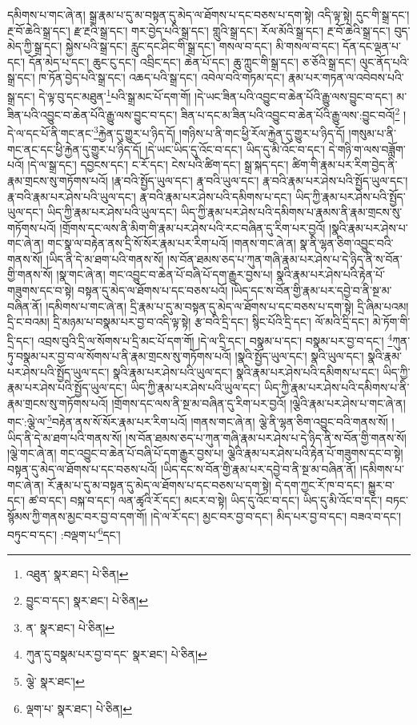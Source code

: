 དམིགས་པ་གང་ཞེ་ན། སྒྲ་རྣམ་པ་དུ་མ་བསྟན་དུ་མེད་ལ་ཐོགས་པ་དང་བཅས་པ་དག་སྟེ། འདི་ལྟ་སྟེ། དུང་གི་སྒྲ་དང་། རྔ་བོ་ཆེའི་སྒྲ་དང་། རྫ་རྔའི་སྒྲ་དང་། གར་བྱེད་པའི་སྒྲ་དང་། གླུའི་སྒྲ་དང་། རོལ་མོའི་སྒྲ་དང་། རྔ་བོ་ཆེའི་སྒྲ་དང་། བུད་མེད་ཀྱི་སྒྲ་དང་། སྐྱེས་པའི་སྒྲ་དང་། རླུང་དང་ཤིང་གི་སྒྲ་དང་། གསལ་བ་དང་། མི་གསལ་བ་དང་། དོན་དང་ལྡན་པ་དང་། དོན་མེད་པ་དང་། ཆུང་ངུ་དང་། འབྲིང་དང་། ཆེན་པོ་དང་། ཆུ་ཀླུང་གི་སྒྲ་དང་། ཅ་ཅོའི་སྒྲ་དང་། ལུང་ནོད་པའི་སྒྲ་དང་། ཁ་ཏོན་བྱེད་པའི་སྒྲ་དང་། འཆད་པའི་སྒྲ་དང་། འབེལ་བའི་གཏམ་དང་། རྣམ་པར་གཏན་ལ་འབེབས་པའི་སྒྲ་དང་། དེ་ལྟ་བུ་དང་མཐུན་\footnote{འཐུན་  སྣར་ཐང་།  པེ་ཅིན། }པའི་སྒྲ་མང་པོ་དག་གོ། །དེ་ཡང་ཟིན་པའི་འབྱུང་བ་ཆེན་པོའི་རྒྱུ་ལས་བྱུང་བ་དང་། མ་ཟིན་པའི་འབྱུང་བ་ཆེན་པོའི་རྒྱུ་ལས་བྱུང་བ་དང་། ཟིན་པ་དང་མ་ཟིན་པའི་འབྱུང་བ་ཆེན་པོའི་རྒྱུ་ལས་:བྱུང་བའོ།\footnote{བྱུང་བ་དང་།  སྣར་ཐང་།  པེ་ཅིན། } །དེ་ལ་དང་པོ་ནི་གང་ནང་\footnote{ན་  སྣར་ཐང་།  པེ་ཅིན། }རྐྱེན་དུ་གྱུར་པ་ཉིད་དོ། །གཉིས་པ་ནི་གང་ཕྱི་རོལ་རྐྱེན་དུ་གྱུར་པ་ཉིད་དོ། །གསུམ་པ་ནི་གང་ནང་དང་ཕྱི་རྐྱེན་དུ་གྱུར་པ་ཉིད་དོ། །དེ་ཡང་ཡིད་དུ་འོང་བ་དང་། ཡིད་དུ་མི་འོང་བ་དང་། དེ་གཉི་ག་ལས་བཟློག་པའོ། །དེ་ལ་སྒྲ་དང་། དབྱངས་དང་། ང་རོ་དང་། ངེས་པའི་ཚིག་དང་། སྒྲ་སྐད་དང་། ཚིག་གི་རྣམ་པར་རིག་བྱེད་ནི་རྣམ་གྲངས་སུ་གཏོགས་པའོ། །རྣ་བའི་སྤྱོད་ཡུལ་དང་། རྣ་བའི་ཡུལ་དང་། རྣ་བའི་རྣམ་པར་ཤེས་པའི་སྤྱོད་ཡུལ་དང་། རྣ་བའི་རྣམ་པར་ཤེས་པའི་ཡུལ་དང་། རྣ་བའི་རྣམ་པར་ཤེས་པའི་དམིགས་པ་དང་། ཡིད་ཀྱི་རྣམ་པར་ཤེས་པའི་སྤྱོད་ཡུལ་དང་། ཡིད་ཀྱི་རྣམ་པར་ཤེས་པའི་ཡུལ་དང་། ཡིད་ཀྱི་རྣམ་པར་ཤེས་པའི་དམིགས་པ་རྣམས་ནི་རྣམ་གྲངས་སུ་གཏོགས་པའོ། །གྲོགས་དང་ལས་ནི་མིག་གི་རྣམ་པར་ཤེས་པའི་རང་བཞིན་དུ་རིག་པར་བྱའོ། །སྣའི་རྣམ་པར་ཤེས་པ་གང་ཞེ་ན། གང་སྣ་ལ་བརྟེན་ནས་དྲི་སོ་སོར་རྣམ་པར་རིག་པའོ། །གནས་གང་ཞེ་ན། སྣ་ནི་ལྷན་ཅིག་འབྱུང་བའི་གནས་སོ། །ཡིད་ནི་དེ་མ་ཐག་པའི་གནས་སོ། །ས་བོན་ཐམས་ཅད་པ་ཀུན་གཞི་རྣམ་པར་ཤེས་པ་དེ་ཉིད་ནི་ས་བོན་གྱི་གནས་སོ། །སྣ་གང་ཞེ་ན། གང་འབྱུང་བ་ཆེན་པོ་བཞི་པོ་དག་རྒྱུར་བྱས་པ། སྣའི་རྣམ་པར་ཤེས་པའི་རྟེན་པོ་གཟུགས་དང་བ་སྟེ། བསྟན་དུ་མེད་ལ་ཐོགས་པ་དང་བཅས་པའོ། །ཡིད་དང་ས་བོན་གྱི་རྣམ་པར་དབྱེ་བ་ནི་སྔ་མ་བཞིན་ནོ། །དམིགས་པ་གང་ཞེ་ན། དྲི་རྣམ་པ་དུ་མ་བསྟན་དུ་མེད་ལ་ཐོགས་པ་དང་བཅས་པ་དག་སྟེ། དྲི་ཞིམ་པའམ། དྲི་ང་བའམ། དྲི་མཉམ་པ་བསྣམ་པར་བྱ་བ་འདི་ལྟ་སྟེ། རྩ་བའི་དྲི་དང་། སྙིང་པོའི་དྲི་དང་། ལོ་མའི་དྲི་དང་། མེ་ཏོག་གི་དྲི་དང་། འབྲས་བུའི་དྲི་ལ་སོགས་པ་དྲི་མང་པོ་དག་གོ། །དེ་ལ་དྲི་དང་། བསྣམ་པ་དང་། བསྣམ་པར་བྱ་བ་དང་། \footnote{ཀུན་དུ་བསྣམ་པར་བྱ་བ་དང་  སྣར་ཐང་།  པེ་ཅིན། }ཀུན་ཏུ་བསྣམ་པར་བྱ་བ་ལ་སོགས་པ་ནི་རྣམ་གྲངས་སུ་གཏོགས་པའོ། །སྣའི་སྤྱོད་ཡུལ་དང་། སྣའི་ཡུལ་དང་། སྣའི་རྣམ་པར་ཤེས་པའི་སྤྱོད་ཡུལ་དང་། སྣའི་རྣམ་པར་ཤེས་པའི་ཡུལ་དང་། སྣའི་རྣམ་པར་ཤེས་པའི་དམིགས་པ་དང་། ཡིད་ཀྱི་རྣམ་པར་ཤེས་པའི་སྤྱོད་ཡུལ་དང་། ཡིད་ཀྱི་རྣམ་པར་ཤེས་པའི་ཡུལ་དང་། ཡིད་ཀྱི་རྣམ་པར་ཤེས་པའི་དམིགས་པ་ནི་རྣམ་གྲངས་སུ་གཏོགས་པའོ། །གྲོགས་དང་ལས་ནི་སྔ་མ་བཞིན་དུ་རིག་པར་བྱའོ། །ལྕེའི་རྣམ་པར་ཤེས་པ་གང་ཞེ་ན། གང་:ལྕེ་ལ་\footnote{ལྕེ་  སྣར་ཐང་། }བརྟེན་ནས་སོ་སོར་རྣམ་པར་རིག་པའོ། །གནས་གང་ཞེ་ན། ལྕེ་ནི་ལྷན་ཅིག་འབྱུང་བའི་གནས་སོ། །ཡིད་ནི་དེ་མ་ཐག་པའི་གནས་སོ། །ས་བོན་ཐམས་ཅད་པ་ཀུན་གཞི་རྣམ་པར་ཤེས་པ་དེ་ཉིད་ནི་ས་བོན་གྱི་གནས་སོ། །ལྕེ་གང་ཞེ་ན། གང་འབྱུང་བ་ཆེན་པོ་བཞི་པོ་དག་རྒྱུར་བྱས་པ། ལྕེའི་རྣམ་པར་ཤེས་པའི་རྟེན་པོ་གཟུགས་དང་བ་སྟེ། བསྟན་དུ་མེད་ལ་ཐོགས་པ་དང་བཅས་པའོ། །ཡིད་དང་ས་བོན་གྱི་རྣམ་པར་དབྱེ་བ་ནི་སྔ་མ་བཞིན་ནོ། །དམིགས་པ་གང་ཞེ་ན། རོ་རྣམ་པ་དུ་མ་བསྟན་དུ་མེད་ལ་ཐོགས་པ་དང་བཅས་པ་དག་སྟེ། དེ་དག་ཀྱང་རོ་ཁ་བ་དང་། སྐྱུར་བ་དང་། ཚ་བ་དང་། བསྐ་བ་དང་། ལན་ཚྭའི་རོ་དང་། མངར་བ་སྟེ། ཡིད་དུ་འོང་བ་དང་། ཡིད་དུ་མི་འོང་བ་དང་། བཏང་སྙོམས་ཀྱི་གནས་མྱང་བར་བྱ་བ་དག་གོ། །དེ་ལ་རོ་དང་། མྱང་བར་བྱ་བ་དང་། མིད་པར་བྱ་བ་དང་། བཟའ་བ་དང་། བཏུང་བ་དང་། :བལྡག་པ་\footnote{ལྡག་པ་  སྣར་ཐང་།  པེ་ཅིན། }དང་། 